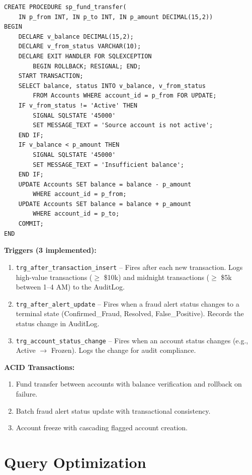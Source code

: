 \documentclass[a4paper,12pt]{article}
\begin{document}
\begin{lstlisting}[style=sqlstyle, caption=Fund Transfer Stored Procedure (excerpt)]
CREATE PROCEDURE sp_fund_transfer(
    IN p_from INT, IN p_to INT, IN p_amount DECIMAL(15,2))
BEGIN
    DECLARE v_balance DECIMAL(15,2);
    DECLARE v_from_status VARCHAR(10);
    DECLARE EXIT HANDLER FOR SQLEXCEPTION 
        BEGIN ROLLBACK; RESIGNAL; END;
    START TRANSACTION;
    SELECT balance, status INTO v_balance, v_from_status 
        FROM Accounts WHERE account_id = p_from FOR UPDATE;
    IF v_from_status != 'Active' THEN
        SIGNAL SQLSTATE '45000' 
        SET MESSAGE_TEXT = 'Source account is not active';
    END IF;
    IF v_balance < p_amount THEN
        SIGNAL SQLSTATE '45000' 
        SET MESSAGE_TEXT = 'Insufficient balance';
    END IF;
    UPDATE Accounts SET balance = balance - p_amount 
        WHERE account_id = p_from;
    UPDATE Accounts SET balance = balance + p_amount 
        WHERE account_id = p_to;
    COMMIT;
END
\end{lstlisting}

\textbf{Triggers (3 implemented):}
\begin{enumerate}
    \item \texttt{trg\_after\_transaction\_insert} -- Fires after each new transaction. Logs high-value transactions ($\geq$ \$10k) and midnight transactions ($\geq$ \$5k between 1--4 AM) to the AuditLog.
    \item \texttt{trg\_after\_alert\_update} -- Fires when a fraud alert status changes to a terminal state (Confirmed\_Fraud, Resolved, False\_Positive). Records the status change in AuditLog.
    \item \texttt{trg\_account\_status\_change} -- Fires when an account status changes (e.g., Active $\rightarrow$ Frozen). Logs the change for audit compliance.
\end{enumerate}

\textbf{ACID Transactions:}
\begin{enumerate}
    \item Fund transfer between accounts with balance verification and rollback on failure.
    \item Batch fraud alert status update with transactional consistency.
    \item Account freeze with cascading flagged account creation.
\end{enumerate}

\section{Query Optimization}
\end{document}

